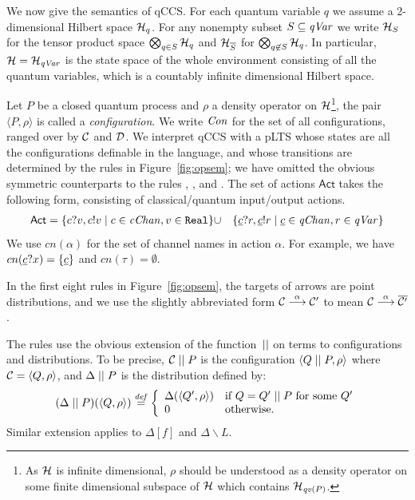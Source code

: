 \documentclass[a4paper,runningheads]{llncs}
\def\>{\ensuremath{\rangle}}
\def\<{\ensuremath{\langle}}
\def\h{\ensuremath{\mathcal{H}}}
\newcommand{\define}{\stackrel{\it def}=}
\newcommand{\pdist}[1]{\overline{#1}  } %
\newcommand{\Act}{\ensuremath{\mathsf{Act}}\xspace}
\newcommand{\pair}[1]{\langle{#1}\rangle}
\newcommand{\Con}{{\it Con}}
\newcommand{\qv}{{\it qv}}
\newcommand{\qc}{\underline{c}}
\newcommand{\qVar}{{\it qVar}}
\newcommand{\cChan}{{\it cChan}}
\newcommand{\qChan}{{\it qChan}}
\newcommand{\CH}{{\cal H}}
\newcommand{\CC}{{\cal C}}
\newcommand{\CD}{{\cal D}}
\begin{document}
We now give the %
semantics of qCCS. For each quantum variable $q$ we assume a 2-dimensional Hilbert space $\CH_q$. For any nonempty subset $S\subseteq \qVar$ we write $\CH_S$ for the tensor product space $\bigotimes_{q\in S}\CH_q$ and $\CH_{\overline{S}}$ for $\bigotimes_{q\not\in S}\CH_q$. In particular, $\CH=\CH_{\qVar}$ is the state space of the whole environment consisting of all the quantum variables, which is a countably infinite dimensional Hilbert space.


Let $P$ be a closed quantum process and $\rho$ a density operator on $\CH$\footnote{As $\CH$ is infinite dimensional, $\rho$ should be understood as a density operator on some finite dimensional subspace of $\CH$ which contains $\h_{\qv(P)}$.}, the pair $\pair{P,\rho}$ is called a \emph{configuration}. We write $\Con$ for the set of all configurations, ranged over by $\CC$ and $\CD$.
We interpret qCCS with a pLTS whose states are all the configurations definable in the language,
and whose transitions are determined by the rules in Figure~\ref{fig:opsem}; we have omitted the obvious
symmetric counterparts to the rules , ,  and
.
The set of actions $\Act$ takes the following form, consisting of classical/quantum input/output actions.
\begin{eqnarray*}
\Act = 
	\sset{c?v, c!v \mid c\in \cChan, v\in\texttt{Real}}&\cup&
	\sset{\qc?r,\qc!r \mid \qc\in \qChan,r\in \qVar}
\end{eqnarray*}
We use $cn(\alpha)$ for the set of channel names in action $\alpha$. For example, we have $cn(\qc?x)=\sset{\qc}$ and $cn(\tau)=\emptyset$.

In the first eight rules in Figure~\ref{fig:opsem}, the targets of arrows are point distributions, and we use the slightly abbreviated form $\CC\ar{\alpha}\CC'$ to mean $\CC\ar{\alpha}\pdist{\CC'}$.

The rules use the obvious extension of the function~$\mathrel{||}$ on terms to configurations and distributions. To be precise,
$\CC\Cpar P$ is the configuration $\<Q\Cpar P,\rho \>$ where $\CC=\<Q,\rho\>$, and
$\Delta\mathrel{||} P$ is the distribution defined by:
\[(\Delta\Cpar P)(\pair{Q,\rho}) \define \left\{\begin{array}{ll}
\Delta(\pair{Q',\rho}) & \mbox{if $Q=Q'\Cpar P$ for some } Q'\\
0 & \mbox{otherwise.}
\end{array}\right.\]
Similar extension applies to $\Delta[f]$ and $\Delta\backslash L$.
\end{document}
